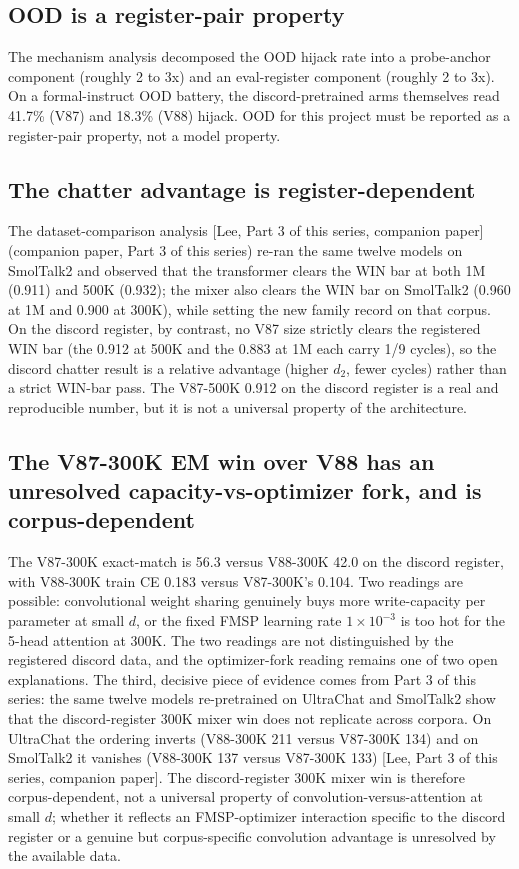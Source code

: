 \documentclass[11pt]{article}
\begin{document}
\subsection{OOD is a register-pair property}

The mechanism analysis decomposed the OOD hijack rate into a probe-anchor component (roughly 2 to 3x) and an eval-register component (roughly 2 to 3x). On a formal-instruct OOD battery, the discord-pretrained arms themselves read 41.7\% (V87) and 18.3\% (V88) hijack. OOD for this project must be reported as a register-pair property, not a model property.

\subsection{The chatter advantage is register-dependent}

The dataset-comparison analysis [Lee, Part 3 of this series, companion paper] (companion paper, Part 3 of this series) re-ran the same twelve models on SmolTalk2 and observed that the transformer clears the WIN bar at both 1M (0.911) and 500K (0.932); the mixer also clears the WIN bar on SmolTalk2 (0.960 at 1M and 0.900 at 300K), while setting the new family record on that corpus. On the discord register, by contrast, no V87 size strictly clears the registered WIN bar (the 0.912 at 500K and the 0.883 at 1M each carry 1/9 cycles), so the discord chatter result is a relative advantage (higher $d_2$, fewer cycles) rather than a strict WIN-bar pass. The V87-500K 0.912 on the discord register is a real and reproducible number, but it is not a universal property of the architecture.

\subsection{The V87-300K EM win over V88 has an unresolved capacity-vs-optimizer fork, and is corpus-dependent}

The V87-300K exact-match is 56.3 versus V88-300K 42.0 on the discord register, with V88-300K train CE 0.183 versus V87-300K's 0.104. Two readings are possible: convolutional weight sharing genuinely buys more write-capacity per parameter at small $d$, or the fixed FMSP learning rate $1 \times 10^{-3}$ is too hot for the 5-head attention at 300K. The two readings are not distinguished by the registered discord data, and the optimizer-fork reading remains one of two open explanations. The third, decisive piece of evidence comes from Part 3 of this series: the same twelve models re-pretrained on UltraChat and SmolTalk2 show that the discord-register 300K mixer win does not replicate across corpora. On UltraChat the ordering inverts (V88-300K 211 versus V87-300K 134) and on SmolTalk2 it vanishes (V88-300K 137 versus V87-300K 133) [Lee, Part 3 of this series, companion paper]. The discord-register 300K mixer win is therefore corpus-dependent, not a universal property of convolution-versus-attention at small $d$; whether it reflects an FMSP-optimizer interaction specific to the discord register or a genuine but corpus-specific convolution advantage is unresolved by the available data.
\end{document}
